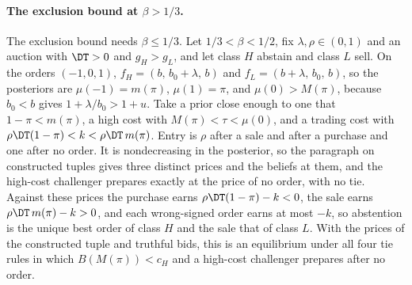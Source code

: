 \paragraph{The exclusion bound at \(\beta>1/3\).}
The exclusion bound needs \(\beta\le1/3\). Let \(1/3<\beta<1/2\), fix \(\lambda,\rho\in(0,1)\) and an auction with
\(\DT>0\) and \(g_H>g_L\), and let class \(H\) abstain and class \(L\) sell. On the orders \((-1,0,1)\),
\(f_H=(b,\,b_0+\lambda,\,b)\) and \(f_L=(b+\lambda,\,b_0,\,b)\), so the posteriors are \(\mu(-1)=m(\pi)\),
\(\mu(1)=\pi\), and \(\mu(0)>M(\pi)\), because \(b_0<b\) gives \(1+\lambda/b_0>1+u\). Take a prior close enough to
one that \(1-\pi<m(\pi)\), a high cost with \(M(\pi)<\tau<\mu(0)\), and a trading cost with
\(\rho\DT(1-\pi)<k<\rho\DT\,m(\pi)\). Entry is \(\rho\) after a sale and after a purchase and one after no order. It
is nondecreasing in the posterior, so the paragraph on constructed tuples gives three distinct prices and the
beliefs at them, and the high-cost challenger prepares exactly at the price of no order, with no tie. Against these
prices the purchase earns \(\rho\DT(1-\pi)-k<0\), the sale earns \(\rho\DT\,m(\pi)-k>0\), and each wrong-signed order
earns at most \(-k\), so abstention is the unique best order of class \(H\) and the sale that of class \(L\). With
the prices of the constructed tuple and truthful bids, this is an equilibrium under all four tie rules in which
\(B(M(\pi))<c_H\) and a high-cost challenger prepares after no order.
